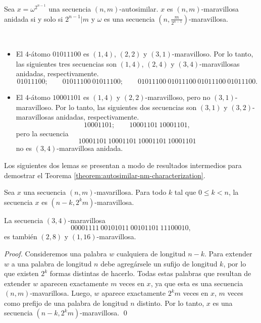 \documentclass[11pt]{article}
\begin{document}
\begin{theorem}
	\label{theorem:autosimilar-nm-characterization}
	Sea $x = \omega^{2^{n-1}}$ una secuencia $(n,m)$-autosimilar.
	$x$ es $(n,m)$-maravillosa anidada si y solo si $2^{n-1} \vert m$ y
	$\omega$
	es una secuencia $\left( n, \frac{m}{2^{n-1}} \right)$-maravillosa.
\end{theorem}

\begin{examples}\ %
	\begin{itemize}
		\item El $4$-átomo $01011100$ es $(1,4)$, $(2,2)$ y
		      $(3,1)$-maravilloso.
		      Por lo tanto, las siguientes tres secuencias son $(1,4)$, $(2,4)$ y
		      $(3,4)$-maravillosas anidadas, respectivamente.
		      \[ 01011100; \qquad 01011100\ 01011100; \qquad 01011100\
			      01011100\ 01011100\ 01011100.
		      \]
		\item El $4$-átomo $10001101$ es $(1,4)$ y $(2,2)$-maravilloso,
		      pero no $(3,1)$-maravilloso.
		      Por lo tanto, las siguientes dos secuencias son $(3,1)$ y $(3,2)$-maravillosas
		      anidadas, respectivamente.
		      \[ 10001101; \qquad 10001101\ 10001101,
		      \]
		      pero la secuencia
		      \[ 10001101\ 10001101\ 10001101\
			      10001101 \]
		      no es $(3,4)$-maravillosa anidada.
	\end{itemize}
\end{examples}

Los siguientes dos lemas se presentan a modo de resultados intermedios para
demostrar el Teorema \ref{theorem:autosimilar-nm-characterization}.

\begin{lema} \label{lemma:marvellous-for-smaller-n}
	Sea $x$ una secuencia $(n,m)$-mavarillosa.
	Para todo $k$ tal que $0 \leq k < n$, la secuencia $x$ es $(n - k,2^{k}
		m)$-maravillosa.
\end{lema}

\begin{example}
	La secuencia $(3,4)$-maravillosa \[ 00001111\ 00101011\ 00101101\ 11100010, \]
	es también $(2,8)$ y $(1,16)$-maravillosa.
\end{example}

\begin{proof}
	Consideremos una palabra $w$ cualquiera de longitud $n - k$.
	Para extender $w$ a una palabra de longitud $n$ debe agregársele un sufijo de
	longitud $k$, por lo que existen $2^{k}$ formas distintas de hacerlo.
	Todas estas palabras que resultan de extender $w$ aparecen exactamente $m$
	veces en $x$, ya que esta es una secuencia $(n,m)$-mavarillosa.
	Luego, $w$ aparece exactamente $2^{k}m$ veces en $x$, $m$ veces como prefijo de
	una palabra de longitud $n$ distinto.
	Por lo tanto, $x$ es una secuencia $(n - k,2^{k}m)$-maravillosa.
	\qed
\end{proof}
\end{document}
